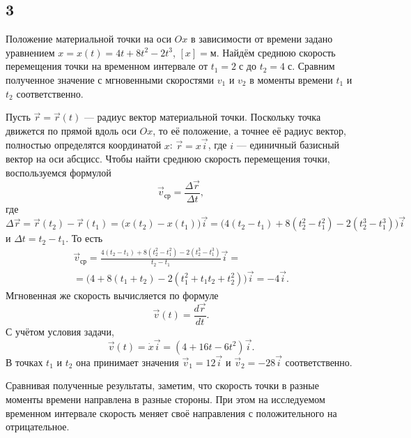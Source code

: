 \subsection{3}

Положение материальной точки на оси $Ox$ в зависимости от времени задано уравнением $x=x(t)=4t+8t^2-2t^3$, $[x]=\text{м}$. Найдём среднюю скорость перемещения точки на временном интервале от $t_1=2\;\text{с}$ до $t_2=4\;\text{с}$. Сравним полученное значение с мгновенными скоростями $v_1$ и $v_2$ в моменты времени $t_1$ и $t_2$ соответственно.

Пусть $\vec r=\vec r(t)$ --- радиус вектор материальной точки. Поскольку точка движется по прямой вдоль оси $Ox$, то её положение, а точнее её радиус вектор, полностью определятся координатой $x$: $\vec r=x\vec i$, где $i$ --- единичный базисный вектор на оси абсцисс. Чтобы найти среднюю скорость перемещения точки, воспользуемся формулой
\[
\vec v_\text{ср}=\frac{\Delta\vec r}{\Delta t},
\]
где
\[
\Delta\vec r=\vec r(t_2)-\vec r(t_1)=\bigl(x(t_2)-x(t_1)\bigr)\vec i=\bigl(4(t_2-t_1)+8(t_2^2-t_1^2)-2(t_2^3-t_1^3)\bigr)\vec i
\]
и $\Delta t=t_2-t_1$. То есть 
\begin{multline*}
\vec v_\text{ср}=\frac{4(t_2-t_1)+8(t_2^2-t_1^2)-2(t_2^3-t_1^3)}{t_2-t_1}\vec i= \\
=\bigl(4+8(t_1+t_2)-2(t_1^2+t_1t_2+t_2^2)\bigr)\vec i=-4\vec i.
\end{multline*}
Мгновенная же скорость вычисляется по формуле
\[
\vec v(t)=\frac{d\vec r}{dt}.
\]
С учётом условия задачи,
\[
\vec v(t)=\dot x\vec i=(4+16t-6t^2)\vec i.
\]
В точках $t_1$ и $t_2$ она принимает значения $\vec v_1=12\vec i$ и $\vec v_2=-28\vec i$ соответственно.

Сравнивая полученные результаты, заметим, что скорость точки в разные моменты времени направлена в разные стороны. При этом на исследуемом временном интервале скорость меняет своё направления с положительного на отрицательное.